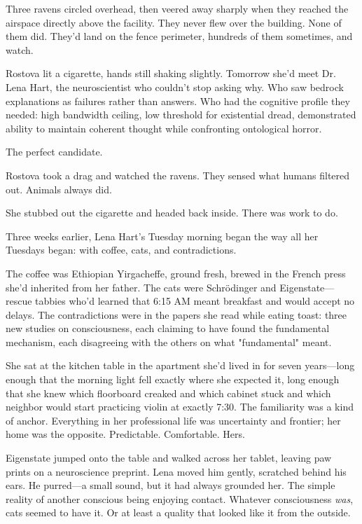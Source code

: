 Three ravens circled overhead, then veered away sharply when they reached the airspace directly above the facility. They never flew over the building. None of them did. They'd land on the fence perimeter, hundreds of them sometimes, and watch.

Rostova lit a cigarette, hands still shaking slightly. Tomorrow she'd meet Dr. Lena Hart, the neuroscientist who couldn't stop asking why. Who saw bedrock explanations as failures rather than answers. Who had the cognitive profile they needed: high bandwidth ceiling, low threshold for existential dread, demonstrated ability to maintain coherent thought while confronting ontological horror.

The perfect candidate.

Rostova took a drag and watched the ravens. They sensed what humans filtered out. Animals always did.

She stubbed out the cigarette and headed back inside. There was work to do.

\scenebreak

Three weeks earlier, Lena Hart's Tuesday morning began the way all her Tuesdays began: with coffee, cats, and contradictions.

The coffee was Ethiopian Yirgacheffe, ground fresh, brewed in the French press she'd inherited from her father. The cats were Schr\"{o}dinger and Eigenstate—rescue tabbies who'd learned that 6:15 AM meant breakfast and would accept no delays. The contradictions were in the papers she read while eating toast: three new studies on consciousness, each claiming to have found the fundamental mechanism, each disagreeing with the others on what "fundamental" meant.

She sat at the kitchen table in the apartment she'd lived in for seven years—long enough that the morning light fell exactly where she expected it, long enough that she knew which floorboard creaked and which cabinet stuck and which neighbor would start practicing violin at exactly 7:30. The familiarity was a kind of anchor. Everything in her professional life was uncertainty and frontier; her home was the opposite. Predictable. Comfortable. Hers.

Eigenstate jumped onto the table and walked across her tablet, leaving paw prints on a neuroscience preprint. Lena moved him gently, scratched behind his ears. He purred—a small sound, but it had always grounded her. The simple reality of another conscious being enjoying contact. Whatever consciousness \textit{was}, cats seemed to have it. Or at least a quality that looked like it from the outside.

